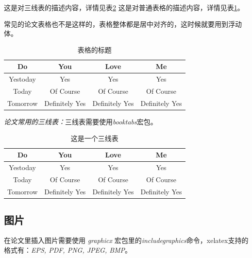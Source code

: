 \documentclass{ctexart} %
\begin{document}
            这是对三线表的描述内容，详情见表\ref{threeLineTable}
            这是对普通表格的描述内容，详情见表\ref{Love}。

            常见的论文表格也不是这样的，表格整体都是居中对齐的，这时候就要用到浮动体。

            \begin{table}[h]
                \centering
                \caption{表格的标题}
                \label{Love}
                \begin{tabular}{cccc}
                    \hline
                    \bfseries Do & \bfseries You & \bfseries Love & \bfseries Me\\
                    \hline
                    Yestoday & Yes & Yes & Yes\\
                    Today & Of Course & Of Course & Of Course\\
                    Tomorrow & Definitely Yes & Definitely Yes & Definitely Yes\\
                    \hline
                \end{tabular}
            \end{table}

            \emph{论文常用的三线表：}三线表需要使用\emph{booktabs}宏包。\\

            \begin{table}[htb] %
                \centering
                \caption{这是一个三线表}
                \label{threeLineTable}
                \begin{tabular}{cccc}
                    \toprule
                    \bfseries Do & \bfseries You & \bfseries Love & \bfseries Me\\
                    \midrule
                    Yestoday & Yes & Yes & Yes\\
                    Today & Of Course & Of Course & Of Course\\
                    Tomorrow & Definitely Yes & Definitely Yes & Definitely Yes\\
                    \bottomrule
                \end{tabular}
            \end{table}
        \subsection{图片}
        在论文里插入图片需要使用 \emph{graphicx} 宏包里的\emph{includegraphics}命令，xelatex支持的格式有：\emph{EPS, PDF, PNG, JPEG, BMP}。
\end{document}
